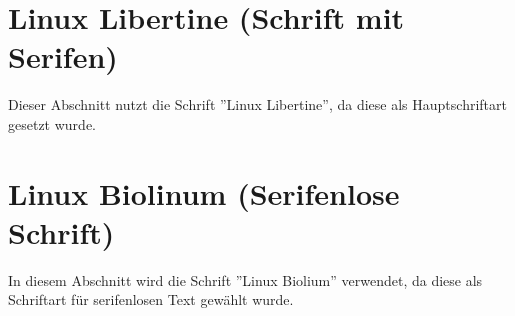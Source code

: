 \documentclass{scrartcl}
\begin{document}
\section{Linux Libertine (Schrift mit Serifen)}
Dieser Abschnitt nutzt die Schrift ''Linux Libertine'', da diese als Hauptschriftart gesetzt wurde.
\section{Linux Biolinum (Serifenlose Schrift)}
\textsf{In diesem Abschnitt wird die Schrift ''Linux Biolium'' verwendet, da diese als Schriftart für serifenlosen Text gewählt wurde.}
\end{document}
